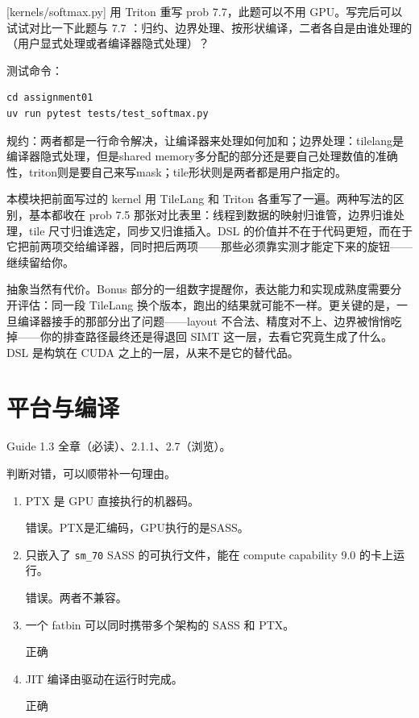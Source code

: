 \documentclass[11pt,a4paper,fontset=none]{ctexart}
\begin{document}
[kernels/softmax.py]
用 Triton 重写 prob 7.7，此题可以不用 GPU。写完后可以试试对比一下此题与 7.7 ：归约、边界处理、按形状编译，二者各自是由谁处理的（用户显式处理或者编译器隐式处理）？

测试命令：

\begin{lstlisting}
cd assignment01
uv run pytest tests/test_softmax.py
\end{lstlisting}

规约：两者都是一行命令解决，让编译器来处理如何加和；边界处理：tilelang是编译器隐式处理，但是shared memory多分配的部分还是要自己处理数值的准确性，triton则是要自己来写mask；tile形状则是两者都是用户指定的。

\begin{lookback}
本模块把前面写过的 kernel 用 TileLang 和 Triton 各重写了一遍。两种写法的区别，基本都收在 prob 7.5 那张对比表里：线程到数据的映射归谁管，边界归谁处理，tile 尺寸归谁选定，同步又归谁插入。DSL 的价值并不在于代码更短，而在于它把前两项交给编译器，同时把后两项——那些必须靠实测才能定下来的旋钮——继续留给你。

抽象当然有代价。Bonus 部分的一组数字提醒你，表达能力和实现成熟度需要分开评估：同一段 TileLang 换个版本，跑出的结果就可能不一样。更关键的是，一旦编译器接手的那部分出了问题——layout 不合法、精度对不上、边界被悄悄吃掉——你的排查路径最终还是得退回 SIMT 这一层，去看它究竟生成了什么。DSL 是构筑在 CUDA 之上的一层，从来不是它的替代品。
\end{lookback}

\section{平台与编译}

\begin{reading}
Guide 1.3 全章（必读）、2.1.1、2.7（浏览）。
\end{reading}

判断对错，可以顺带补一句理由。
\begin{enumerate}[label=(\alph*)]
  \item PTX 是 GPU 直接执行的机器码。

  错误。PTX是汇编码，GPU执行的是SASS。

  \item 只嵌入了 \texttt{sm\_70} SASS 的可执行文件，能在 compute capability 9.0 的卡上运行。

  错误。两者不兼容。

  \item 一个 fatbin 可以同时携带多个架构的 SASS 和 PTX。

  正确

  \item JIT 编译由驱动在运行时完成。
  
  正确
\end{enumerate}
\end{document}

